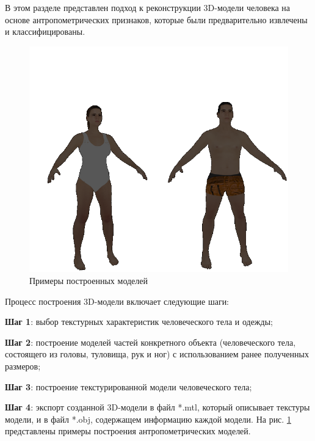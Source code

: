  В этом разделе представлен подход к реконструкции 3D-модели человека на основе антропометрических признаков, которые были предварительно извлечены и классифицированы.
\begin{figure}[ht!]
\centering
\includegraphics [width=0.6\linewidth] {images/h22.png}
\begin{center}
\caption{Примеры построенных моделей} \label{img17}
\end{center}
\end{figure}


Процесс построения 3D-модели включает следующие шаги:

\textbf{Шаг 1}: выбор текстурных характеристик человеческого тела и одежды;

\textbf{Шаг 2}: построение моделей частей конкретного объекта (человеческого тела, состоящего из головы, туловища, рук и ног) с использованием ранее полученных размеров;

\textbf{Шаг 3}: построение текстурированной модели человеческого тела;

\textbf{Шаг 4}: экспорт созданной 3D-модели в файл *.mtl, который описывает текстуры модели, и в файл *.obj, содержащем информацию каждой модели. На рис. \ref{img17} представлены примеры построения антропометрических моделей.

